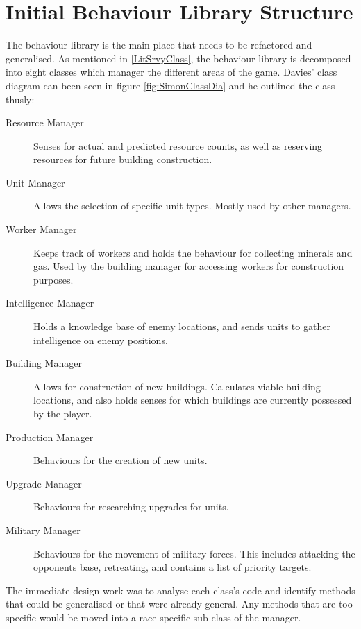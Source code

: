 \documentclass[11pt,openright,a4paper]{report}
\begin{document}
\section{Initial Behaviour Library Structure}
The behaviour library is the main place that needs to be refactored and generalised. As mentioned in \ref{LitSrvyClass}, the behaviour library is decomposed into eight classes which manager the different areas of the game. Davies' class diagram can been seen in figure \ref{fig:SimonClassDia} and he outlined the class thusly:
\begin{description}
\item[Resource Manager]{Senses for actual and predicted resource counts, as well as reserving resources for future building construction.}
\item[Unit Manager]{Allows the selection of specific unit types. Mostly used by other managers.}
\item[Worker Manager]{Keeps track of workers and holds the behaviour for collecting minerals and gas. Used by the building manager for accessing workers for construction purposes.}
\item[Intelligence Manager]{Holds a knowledge base of enemy locations, and sends units to gather intelligence on enemy positions.}
\item[Building Manager]{Allows for construction of new buildings. Calculates viable building locations, and also holds senses for which buildings are currently possessed by the player.}
\item[Production Manager]{Behaviours for the creation of new units.}
\item[Upgrade Manager]{Behaviours for researching upgrades for units.}
\item[Military Manager]{Behaviours for the movement of military forces. This includes attacking the opponents base, retreating, and contains a list of priority targets.}
\end{description}

The immediate design work was to analyse each class's code and identify methods that could be generalised or that were already general. Any methods that are too specific would be moved into a race specific sub-class of the manager.
\end{document}
